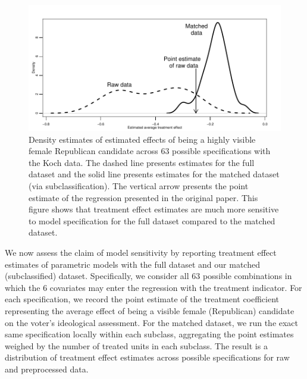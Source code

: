 \documentclass[11pt,titlepage]{article}
\begin{document}
\begin{figure}[t] 
 \begin{center}
    \includegraphics{figs/kochdens.pdf}
  \end{center}
  \vspace{-0.275in}
  \caption{Density estimates of estimated effects of being
    a highly visible female Republican candidate across 63 possible
    specifications with the Koch data.  The dashed line presents
    estimates for the full dataset and the solid line presents
    estimates for the matched dataset (via subclassification).  The
    vertical arrow presents the point estimate of the regression
    presented in the original paper.  This figure shows that treatment
    effect estimates are much more sensitive to model specification
    for the full dataset compared to the matched dataset.}
  \label{fg:kochdens}
\end{figure}

We now assess the claim of model sensitivity by reporting treatment
effect estimates of parametric models with the full dataset and our
matched (subclassified) dataset.  Specifically, we consider all 63
possible combinations in which the 6 covariates may enter the
regression with the treatment indicator.  For each specification, we
record the point estimate of the treatment coefficient representing
the average effect of being a visible female (Republican) candidate on
the voter's ideological assessment.  For the matched dataset, we run
the exact same specification locally within each subclass, aggregating
the point estimates weighed by the number of treated units in each
subclass.  The result is a distribution of treatment effect estimates
across possible specifications for raw and preprocessed data.
\end{document}
